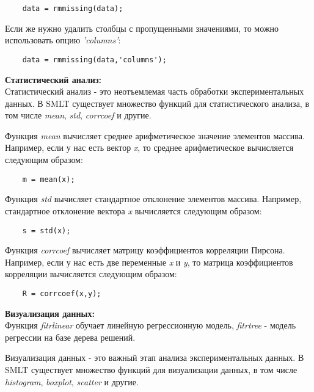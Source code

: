 \documentclass[a4paper, 12pt]{article}%
\begin{document}
\begin{titlepage}
	\begin{lstlisting}
	data = rmmissing(data);
	\end{lstlisting}
	Если же нужно удалить столбцы с пропущенными значениями, то можно использовать опцию \textit{'columns'}:\\
	
	\begin{lstlisting}
	data = rmmissing(data,'columns');
	\end{lstlisting}
	
	\textbf{Статистический анализ:}\\
	\hspace{\parindent}Статистический анализ - это неотъемлемая часть обработки экспериментальных данных. В SMLT существует множество функций для статистического анализа, в том числе \textit{mean}, \textit{std}, \textit{corrcoef} и другие.
	
	Функция \textit{mean} вычисляет среднее арифметическое значение элементов массива. Например, если у нас есть вектор \textit{x}, то среднее арифметическое вычисляется следующим образом:\\
	
	
	\begin{lstlisting}
	m = mean(x);
	\end{lstlisting}
	
	Функция \textit{std} вычисляет стандартное отклонение элементов массива. Например, стандартное отклонение вектора \textit{x} вычисляется следующим образом:\\
	
	\begin{lstlisting}
	s = std(x);
	\end{lstlisting}
	
	Функция \textit{corrcoef} вычисляет матрицу коэффициентов корреляции Пирсона. Например, если у нас есть две переменные \textit{x} и \textit{y}, то матрица коэффициентов корреляции вычисляется следующим образом:\\
	
	\begin{lstlisting}
	R = corrcoef(x,y);
	\end{lstlisting}
	
	\textbf{Визуализация данных:}\\
	Функция \textit{fitrlinear} обучает линейную регрессионную модель, \textit{fitrtree} - модель регрессии на базе дерева решений.


	Визуализация данных - это важный этап анализа экспериментальных данных. В SMLT существует множество функций для визуализации данных, в том числе \textit{histogram}, \textit{boxplot}, \textit{scatter} и другие.
	

\end{titlepage}
\end{document}
